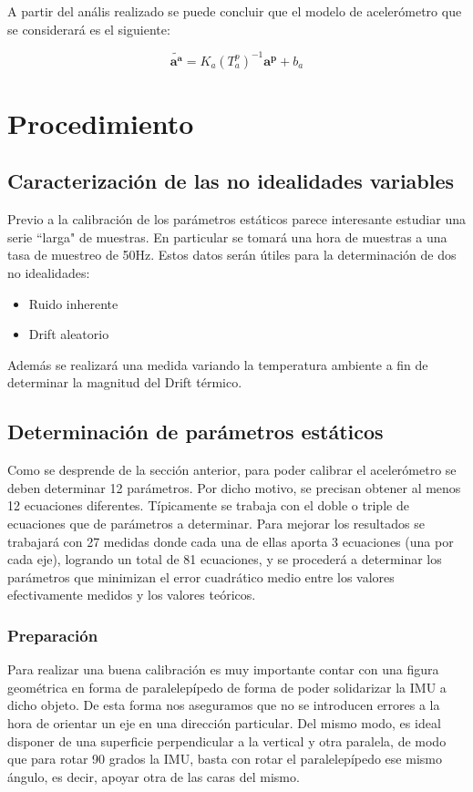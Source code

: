 \documentclass[main]{subfiles}
\begin{document}
A partir del anális realizado se puede concluir que el modelo de acelerómetro que se considerará es el siguiente:

$$\tilde{\mathbf{a^a}}=K_a(T_a^p)^{-1}\mathbf{a^p}+b_a$$

\section{Procedimiento}
\subsection{Caracterización de las no idealidades variables}

Previo a la calibración de los parámetros estáticos parece interesante estudiar una serie ``larga" de muestras. En particular se tomará una hora de muestras a una tasa de muestreo de 50Hz. Estos datos serán útiles para la determinación de dos no idealidades:  
\begin{itemize}
\item Ruido inherente
\item Drift aleatorio
\end{itemize}

Además se realizará una medida variando la temperatura ambiente a fin de determinar la magnitud del Drift térmico.

\subsection{Determinación de parámetros estáticos}

Como se desprende de la sección anterior, para poder calibrar el acelerómetro se deben determinar 12 parámetros. Por dicho motivo, se precisan obtener al menos 12 ecuaciones diferentes. Típicamente se trabaja con el doble o triple de ecuaciones que de parámetros a determinar. Para mejorar los resultados se trabajará con 27 medidas donde cada una de ellas aporta 3 ecuaciones (una por cada eje), logrando un total de 81 ecuaciones, y se procederá a determinar los parámetros que minimizan el error cuadrático medio entre los valores efectivamente medidos y los valores teóricos. 

\subsubsection*{Preparación}
Para realizar una buena calibración es muy importante contar con una figura geométrica en forma de paralelepípedo de forma de poder solidarizar la IMU a dicho objeto. De esta forma nos aseguramos que no se introducen errores a la hora de orientar un eje en una dirección particular. Del mismo modo, es ideal disponer de una superficie perpendicular a la vertical y otra paralela, de modo que para rotar 90 grados la IMU, basta con rotar el paralelepípedo ese mismo ángulo, es decir, apoyar otra de las caras del mismo. \\
\end{document}
